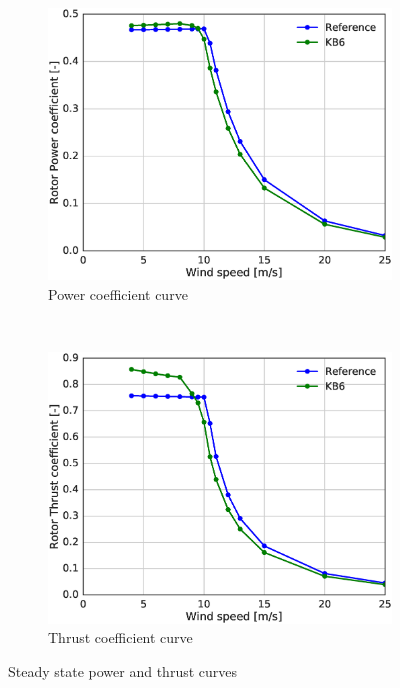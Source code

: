 \begin{figure}[tph]
\begin{subfigure}{0.50\textwidth}
\includegraphics[width=\linewidth]{figures/KB6_final/KB6_Cp_HS2.eps}
\caption{Power coefficient curve}
\label{subfig:KB6_CP}
\end{subfigure}
 ~
\begin{subfigure}{0.50\textwidth}
\includegraphics[width=\linewidth]{figures/KB6_final/KB6_CT_HS2.eps}
\caption{Thrust coefficient curve}
\label{subfig:KB6_CT}
\end{subfigure}

\caption{Steady state power and thrust curves}
\label{fig:KB6_power_thrust}
\end{figure}

